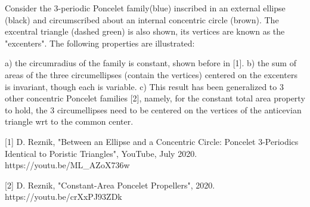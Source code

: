 Consider the 3-periodic Poncelet family(blue) inscribed in an external ellipse (black) and circumscribed about an internal concentric circle (brown). The excentral triangle (dashed green) is also shown, its vertices are known as the "excenters". The following properties are illustrated:

a) the circumradius of the family is constant, shown before in [1].
b) the sum of areas of the three circumellipses (contain the vertices) centered on the excenters is invariant, though each is variable.
c) This result has been generalized to 3 other concentric Poncelet families [2], namely, for the constant total area property to hold, the 3 circumellipses need to be centered on the vertices of the anticevian triangle wrt to the common center.

[1] D. Reznik, "Between an Ellipse and a Concentric Circle: Poncelet 3-Periodics Identical to Poristic Triangles", YouTube, July 2020. https://youtu.be/ML_AZoX736w

[2] D. Reznik, "Constant-Area Poncelet Propellers", 2020. https://youtu.be/crXxPJ93ZDk